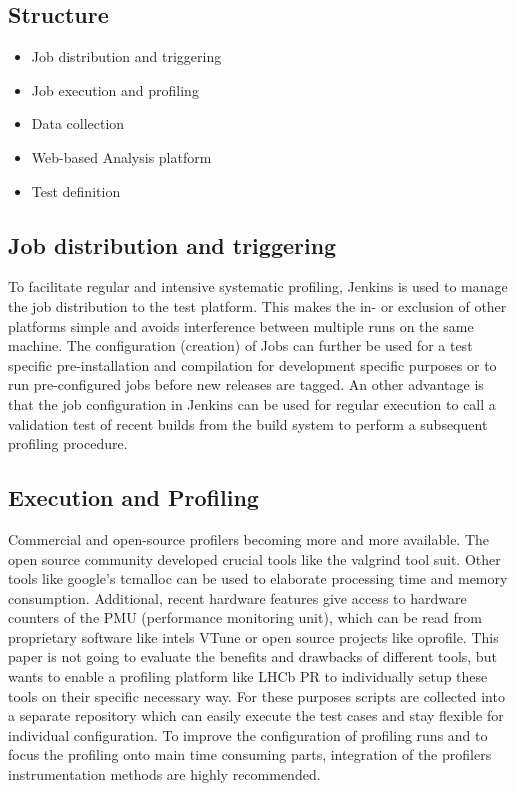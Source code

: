 \documentclass[a4paper]{jpconf}
\begin{document}
\subsection{Structure}
\label{sec:structure}

\begin{itemize}
 \item Job distribution and triggering
 \item Job execution and profiling
 \item Data collection
 \item Web-based Analysis platform
 \item Test definition
\end{itemize}

\subsection{Job distribution and triggering}
\label{sec:job_distribution}

To facilitate regular and intensive systematic profiling, Jenkins is used to manage the job distribution to the test platform. This makes the in- or exclusion of other platforms simple and avoids interference between multiple runs on the same machine. The configuration (creation) of Jobs can further be used for a test specific pre-installation and compilation for development specific purposes or to run pre-configured jobs before new releases are tagged.
\newline
An other advantage is that the job configuration in Jenkins can be used for regular execution to call a validation test of recent builds from the build system to perform a subsequent profiling procedure.  

\subsection{Execution and Profiling}
\label{sec:execution_and_profiling}

Commercial and open-source profilers becoming more and more available. The open source community developed crucial tools like the valgrind tool suit. Other tools like google's tcmalloc can be used to elaborate processing time and memory consumption. Additional, recent hardware features give access to hardware counters of the PMU (performance monitoring unit), which can be read from proprietary software like intels VTune or open source projects like oprofile.
\newline
This paper is not going to evaluate the benefits and drawbacks of different tools, but wants to enable a profiling platform like LHCb PR to individually setup these tools on their specific necessary way. For these purposes scripts are collected into a separate repository which can easily execute the test cases and stay flexible for individual configuration. To improve the configuration of profiling runs and to focus the profiling onto main time consuming parts, integration of the profilers instrumentation methods are highly recommended.
\end{document}
